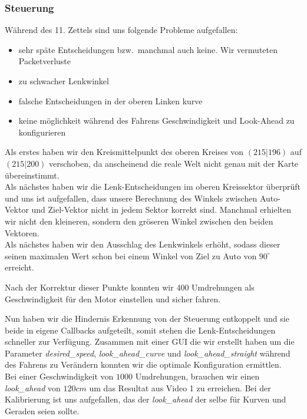 \documentclass[10pt,oneside,a4paper]{article}
\begin{document}
      \subsubsection{Steuerung}
        W\"ahrend des 11. Zettels sind uns folgende Probleme aufgefallen:
        \begin{itemize}
          \item sehr sp\"ate Entscheidungen bzw.\ manchmal auch keine. Wir vermuteten Packetverluste
          \item zu schwacher Lenkwinkel
          \item falsche Entscheidungen in der oberen Linken kurve
          \item keine m\"oglichkeit w\"ahrend des Fahrens Geschwindigkeit und Look-Ahead zu
            konfigurieren
        \end{itemize}
        Als erstes haben wir den Kreismittelpunkt des oberen Kreises von $(215|196)$ auf $(215|200)$
        verschoben, da anscheinend die reale Welt nicht genau mit der Karte \"ubereinstimmt.\\
        Als n\"achstes haben wir die Lenk-Entscheidungen im oberen Kreissektor \"uberpr\"uft und uns ist
        aufgefallen, dass unsere Berechnung des Winkels zwischen Auto-Vektor und Ziel-Vektor nicht
        in jedem Sektor korrekt sind. Manchmal erhielten wir nicht den kleineren, sondern den
        gr\"oseren Winkel zwischen den beiden Vektoren.\\
        Als n\"achstes haben wir den Ausschlag des Lenkwinkels erh\"oht, sodass dieser seinen
        maximalen Wert schon bei einem Winkel von Ziel zu Auto von $90^\circ$ erreicht.

        Nach der Korrektur dieser Punkte konnten wir 400 Umdrehungen als Geschwindigkeit
        f\"ur den Motor einstellen und sicher fahren.

        Nun haben wir die Hindernis Erkennung von der Steuerung entkoppelt und sie beide in eigene
        Callbacks aufgeteilt, somit stehen die Lenk-Entscheidungen schneller zur Verf\"ugung.
        Zusammen mit einer GUI die wir erstellt haben um die Parameter \emph{desired\_speed},
        \emph{look\_ahead\_curve} und \emph{look\_ahead\_straight} w\"ahrend des Fahrens zu
        Ver\"andern konnten wir die optimale Konfiguration ermittlen.\\
        Bei einer Geschwindigkeit von $1000$ Umdrehungen, brauchen wir einen \emph{look\_ahead} von
        $120cm$ um das Resultat aus Video 1 zu erreichen. Bei der Kalibrierung ist uns aufgefallen,
        das der \emph{look\_ahead} der selbe f\"ur Kurven und Geraden seien sollte.
\end{document}
